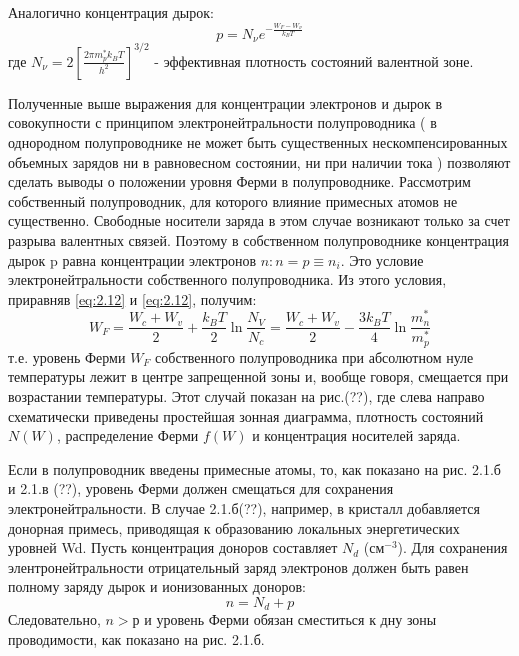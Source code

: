 Аналогично концентрация дырок: 
\begin{equation}
	p=N_{\nu} e^{-\frac{W_{F}-W_{\nu}}{k_{B} T}}
	\label{eq:2.13}
\end{equation}
где $N_{\nu}=2\left[\frac{2 \pi m_{p}^{*} k_{B} T}{h^{2}}\right]^{3 / 2}$ - эффективная плотность состояний валентной зоне.

Полученные выше выражения для концентрации электронов и дырок в совокупности с принципом электронейтральности
полупроводника ( в однородном полупроводнике не может быть существенных нескомпенсированных объемных зарядов ни в
равновесном состоянии, ни при наличии тока ) позволяют сделать выводы о положении уровня Ферми в полупроводнике.
Рассмотрим собственный полупроводник, для которого влияние примесных атомов не существенно. Свободные носители заряда в
этом случае возникают только за счет разрыва валентных связей. Поэтому в собственном полупроводнике концентрация дырок p
равна концентрации электронов $ n: n = p \equiv n_i$. Это условие электронейтральности собственного полупроводника. Из этого
условия, приравняв \eqref{eq:2.12} и \eqref{eq:2.12}, получим:
\begin{equation}
	W_{F}=\frac{W_{c}+W_{v}}{2}+\frac{k_{B} T}{2} \ln \frac{N_{V}}{N_{c}}=\frac{W_{c}+W_{v}}{2}-\frac{3 k_{B} T}{4} \ln \frac{m_{n}^{*}}{m_{p}^{*}}
	\label{eq:2.14}
\end{equation}
т.е. уровень Ферми $W_F$ собственного полупроводника при абсолютном нуле температуры лежит в центре запрещенной зоны и,
вообще говоря, смещается при возрастании температуры. Этот случай показан на рис.(??), где слева направо схематически
приведены простейшая зонная диаграмма, плотность состояний $N(W)$, распределение Ферми $f (W)$ и концентрация носителей
заряда.

Если в полупроводник введены примесные атомы, то, как показано на рис. 2.1.б и 2.1.в (??), уровень Ферми должен смещаться для
сохранения электронейтральности. В случае 2.1.б(??), например, в кристалл добавляется донорная примесь, приводящая к
образованию локальных энергетических уровней Wd. Пусть концентрация доноров составляет $N_d$ (см$^{-3}$). Для сохранения
элентронейтральности отрицательный заряд электронов должен быть равен полному заряду дырок и ионизованных доноров:
\begin{equation}
	n = N_d+p
	\label{eq:2.15}
\end{equation}
Следовательно, $n>р$ и уровень Ферми обязан сместиться к дну зоны проводимости, как показано на рис. 2.1.б.

